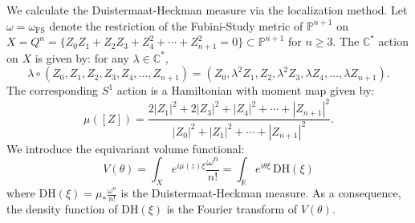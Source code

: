 \documentclass[12pt]{amsart}
\theoremstyle{definition}
\newcommand{\IC}{{\mathbb C}}
\newcommand{\IP}{{\mathbb P}}
\newcommand{\IR}{{\mathbb R}}
\begin{document}
We calculate the Duistermaat-Heckman measure via the localization method. 
Let $\omega=\omega_{\mathrm{FS}}$ denote the restriction of the Fubini-Study metric of $\IP^{n+1}$ on $X=Q^n=\{Z_0Z_1+Z_2Z_3+Z_4^2+\cdots+Z_{n+1}^2=0\}\subset \IP^{n+1}$ for $n\ge 3$. The $\IC^*$ action on $X$ is given by: for any $\lambda\in \IC^*$, 
\begin{equation*}
    \lambda\circ (Z_0, Z_1, Z_2, Z_3, Z_4, \dots, Z_{n+1})=(Z_0, \lambda^2 Z_1, Z_2, \lambda^2 Z_3, \lambda Z_4, \dots, \lambda Z_{n+1}).
\end{equation*}
The corresponding $S^1$ action is a Hamiltonian with moment map given by:
\begin{equation*}
    \mu([Z])=\frac{2|Z_1|^2+2|Z_3|^2+|Z_4|^2+\cdots+|Z_{n+1}|^2}{|Z_0|^2+|Z_1|^2+\cdots +|Z_{n+1}|^2}.
\end{equation*}
We introduce the equivariant volume functional:
\begin{equation*}
    V(\theta)=\int_Xe^{i\mu(z) \xi}\frac{\omega^n}{n!}=\int_\IR e^{i\theta \xi}\, \mathrm{DH}(\xi)
\end{equation*}
where $\mathrm{DH}(\xi)=\mu_* \frac{\omega^n}{n!}$ is the Duistermaat-Heckman measure. As a consequence, the density function of $\mathrm{DH}(\xi)$ is the Fourier transform of $V(\theta)$. 
    
\end{document}
